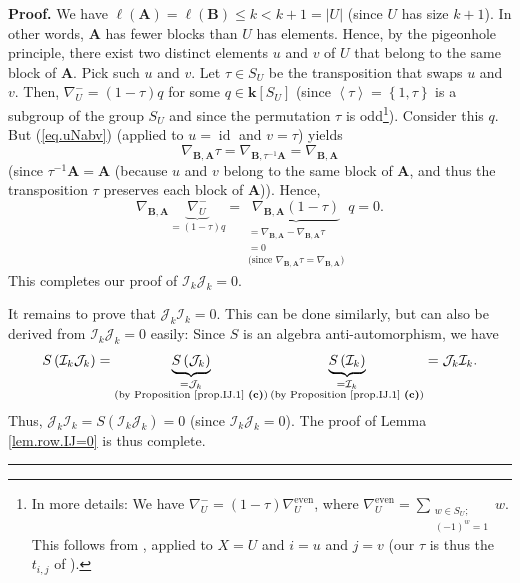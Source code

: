 \documentclass[numbers=enddot,12pt,final,onecolumn,notitlepage]{scrartcl}%
\numberwithin{exer}{subsection}
\theoremstyle{definition}
\newenvironment{proof}[1][Proof]{\noindent\textbf{#1.} }{\ \rule{0.5em}{0.5em}}
\let\sumnonlimits\sum
\renewcommand{\sum}{\sumnonlimits\limits}
\begin{document}
\begin{proof}
We have $\ell\left(  \mathbf{A}\right)  =\ell\left(  \mathbf{B}\right)  \leq
k<k+1=\left\vert U\right\vert $ (since $U$ has size $k+1$). In other words,
$\mathbf{A}$ has fewer blocks than $U$ has elements. Hence, by the pigeonhole
principle, there exist two distinct elements $u$ and $v$ of $U$ that belong to
the same block of $\mathbf{A}$. Pick such $u$ and $v$. Let $\tau\in S_{U}$ be
the transposition that swaps $u$ and $v$. Then, $\nabla_{U}^{-}=\left(
1-\tau\right)  q$ for some $q\in\mathbf{k}\left[  S_{U}\right]  $ (since
$\left\langle \tau\right\rangle =\left\{  1,\tau\right\}  $ is a subgroup of
the group $S_{U}$ and since the permutation $\tau$ is odd\footnote{In more
details: We have $\nabla_{U}^{-}=\left(  1-\tau\right)  \nabla_{U}%
^{\operatorname*{even}}$, where $\nabla_{U}^{\operatorname*{even}}%
=\sum_{\substack{w\in S_{U};\\\left(  -1\right)  ^{w}=1}}w$. This follows from
\cite[Proposition 3.7.4 \textbf{(d)}]{sga}, applied to $X=U$ and $i=u$ and
$j=v$ (our $\tau$ is thus the $t_{i,j}$ of \cite[Proposition 3.7.4
\textbf{(d)}]{sga}).}). Consider this $q$. But (\ref{eq.uNabv}) (applied to
$u=\operatorname*{id}$ and $v=\tau$) yields%
\[
\nabla_{\mathbf{B},\mathbf{A}}\tau=\nabla_{\mathbf{B},\tau^{-1}\mathbf{A}%
}=\nabla_{\mathbf{B},\mathbf{A}}%
\]
(since $\tau^{-1}\mathbf{A}=\mathbf{A}$ (because $u$ and $v$ belong to the
same block of $\mathbf{A}$, and thus the transposition $\tau$ preserves each
block of $\mathbf{A}$)). Hence,%
\[
\nabla_{\mathbf{B},\mathbf{A}}\underbrace{\nabla_{U}^{-}}_{=\left(
1-\tau\right)  q}=\underbrace{\nabla_{\mathbf{B},\mathbf{A}}\left(
1-\tau\right)  }_{\substack{=\nabla_{\mathbf{B},\mathbf{A}}-\nabla
_{\mathbf{B},\mathbf{A}}\tau\\=0\\\text{(since }\nabla_{\mathbf{B},\mathbf{A}%
}\tau=\nabla_{\mathbf{B},\mathbf{A}}\text{)}}}q=0.
\]
This completes our proof of $\mathcal{I}_{k}\mathcal{J}_{k}=0$.

It remains to prove that $\mathcal{J}_{k}\mathcal{I}_{k}=0$. This can be done
similarly, but can also be derived from $\mathcal{I}_{k}\mathcal{J}_{k}=0$
easily: Since $S$ is an algebra anti-automorphism, we have%
\[
S\left(  \mathcal{I}_{k}\mathcal{J}_{k}\right)  =\underbrace{S\left(
\mathcal{J}_{k}\right)  }_{\substack{=\mathcal{J}_{k}\\\text{(by Proposition
\ref{prop.IJ.1} \textbf{(c)})}}}\underbrace{S\left(  \mathcal{I}_{k}\right)
}_{\substack{=\mathcal{I}_{k}\\\text{(by Proposition \ref{prop.IJ.1}
\textbf{(c)})}}}=\mathcal{J}_{k}\mathcal{I}_{k}.
\]
Thus, $\mathcal{J}_{k}\mathcal{I}_{k}=S\left(  \mathcal{I}_{k}\mathcal{J}%
_{k}\right)  =0$ (since $\mathcal{I}_{k}\mathcal{J}_{k}=0$). The proof of
Lemma \ref{lem.row.IJ=0} is thus complete.
\end{proof}
\end{document}
